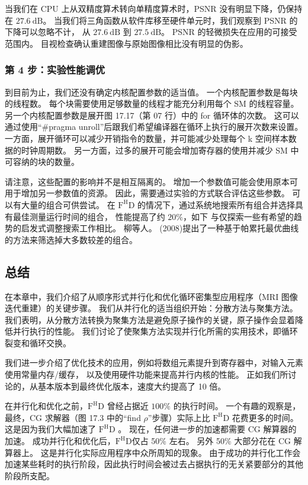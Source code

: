 当我们在 CPU 上从双精度算术转向单精度算术时，PSNR 没有明显下降，仍保持在 $27.6 \mathrm{~dB}$。 
当我们将三角函数从软件库移至硬件单元时，我们观察到 PSNR 的下降可以忽略不计，
从 $27.6 \mathrm{~dB}$ 到 $27.5 \mathrm{~dB}$。 PSNR 的轻微损失在应用的可接受范围内。 
目视检查确认重建图像与原始图像相比没有明显的伪影。

\subsubsection{第 4 步：实验性能调优}
到目前为止，我们还没有确定内核配置参数的适当值。 一个内核配置参数是每块的线程数。 
每个块需要使用足够数量的线程才能充分利用每个 SM 的线程容量。 
另一个内核配置参数是展开图 17.17（第 07 行）中的 for 循环体的次数。 
这可以通过使用“\#pragma unroll”后跟我们希望编译器在循环上执行的展开次数来设置。 
一方面，展开循环可以减少开销指令的数量，并可能减少处理每个 k 空间样本数据的时钟周期数。 
另一方面，过多的展开可能会增加寄存器的使用并减少 SM 中可容纳的块的数量。

请注意，这些配置的影响并不是相互隔离的。 增加一个参数值可能会使用原本可用于增加另一参数值的资源。 
因此，需要通过实验的方式联合评估这些参数。 可以有大量的组合可供尝试。 
在 $\mathrm{F}^{\mathrm{H}} \mathrm{D}$ 的情况下，通过系统地搜索所有组合并选择具有最佳测量运行时间的组合，
性能提高了约 $20 \%$，如下 与仅探索一些有希望的趋势的启发式调整搜索工作相比。 
柳等人。 (2008)提出了一种基于帕累托最优曲线的方法来筛选掉大多数较差的组合。

\subsection{总结}
在本章中，我们介绍了从顺序形式并行化和优化循环密集型应用程序（MRI 图像迭代重建）的关键步骤。 
我们从并行化的适当组织开始：分散方法与聚集方法。 
我们表明，从分散方法转换为聚集方法是避免原子操作的关键，原子操作会显着降低并行执行的性能。 
我们讨论了使聚集方法实现并行化所需的实用技术，即循环裂变和循环交换。

我们进一步介绍了优化技术的应用，例如将数组元素提升到寄存器中，对输入元素使用常量内存/缓存，
以及使用硬件功能来提高并行内核的性能。 正如我们所讨论的，从基本版本到最终优化版本，速度大约提高了 10 倍。

在并行化和优化之前，$\mathrm{F}^{\mathrm{H}} \mathrm{D}$ 曾经占据近 $100 \%$ 的执行时间。 
一个有趣的观察是，最终，CG 求解器（图 17.3 中的“find $\rho$”步骤）实际上比 $\mathrm{F}^{\mathrm{H}} \mathrm{D}$ 花费更多的时间。 
这是因为我们大幅加速了 $\mathrm{F}^{\mathrm{H}} \mathrm{D}$ 。 现在，任何进一步的加速都需要 CG 解算器的加速。 
成功并行化和优化后，$\mathrm{F}^{\mathrm{H}} \mathrm{D}$仅占 50\% 左右。 
另外 50\% 大部分花在 CG 解算器上。 这是并行化实际应用程序中众所周知的现象。 
由于成功的并行化工作会加速某些耗时的执行阶段，因此执行时间会被过去占据执行的无关紧要部分的其他阶段所支配。
